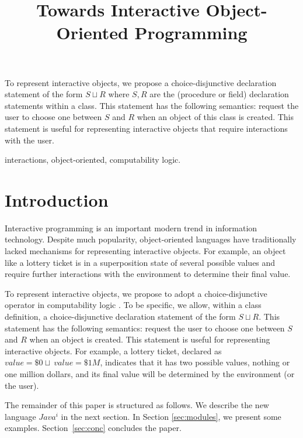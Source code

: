 \documentclass[letter]{ieice}
\title{Towards Interactive Object-Oriented Programming}
\newcommand{\add}{\sqcup} \newcommand{\adc}{\&} \newcommand{\Cscr}{{\cal C}}
\begin{document}
\maketitle
\begin{summary}
To represent interactive objects,  we propose
 a choice-disjunctive declaration statement of the form
$S \add R$ where $S, R$ are the (procedure or field) declaration statements within
 a class.
This statement has the
following semantics: request the user to choose one between $S$ and $R$ when an
object of this class is created.
  This statement is useful for representing interactive objects that require
interactions with the user.
\end{summary}
\begin{keywords}
interactions, object-oriented, computability logic.
\end{keywords}


\section{Introduction}\label{sec:intro}

Interactive  programming \cite{Lyn96,Rol10} is an important modern trend in information technology.
 Despite much popularity, object-oriented languages \cite{Avi03,Jos12,Jos08} have
traditionally lacked mechanisms  for representing interactive objects.
For example, an object like a lottery ticket is in a superposition state of
several possible values and require further interactions with the environment to determine
their final value.

To represent interactive objects,  we propose to adopt a choice-disjunctive
operator in computability logic \cite{Jap03,Jap08}. To be specific,
we allow, within a class definition,
 a choice-disjunctive declaration statement of the form
$S \add R$.
This statement has the
following semantics: request the user to choose one between  $S$ and $R$ when
an object is created.
  This statement  is useful for representing interactive objects. For example,
a lottery ticket, declared as $value = \$0 \add\ value = \$1M$, indicates that it
has two possible values, nothing or one million dollars, and its final value will
be determined by the environment (or the user).




The remainder of this paper is structured as follows. We describe the new language $Java^i$
 in
the next section. In Section \ref{sec:modules}, we
present some examples.
Section~\ref{sec:conc} concludes the paper.
\end{document}
